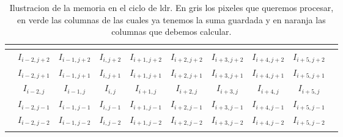 \begin{table}[h]
\centering
{}
\begin{tabular}{l|c|c|c|c|c|c|c|c|l}
 & \multicolumn{1}{l|}{}      & \multicolumn{1}{l|}{}       & \multicolumn{1}{l|}{}       & \multicolumn{1}{l|}{}
 & \multicolumn{1}{l|}{}      & \multicolumn{1}{l|}{}       & \multicolumn{1}{l|}{}       & \multicolumn{1}{l|}{}       &  \\ \hline

 & \cellcolor[HTML]{76E6A3}$I_{i-2,j+2}$ & \cellcolor[HTML]{98D0AE}$I_{i-1,j+2}$ & \cellcolor[HTML]{76E6A3}$I_{i  ,j+2}$ & \cellcolor[HTML]{98D0AE}$I_{i+1,j+2}$
 & \cellcolor[HTML]{FFBB78}$I_{i+2,j+2}$ & \cellcolor[HTML]{FF9D3E}$I_{i+3,j+2}$ & \cellcolor[HTML]{FFBB78}$I_{i+4,j+2}$ & \cellcolor[HTML]{FF9D3E}$I_{i+5,j+2}$ &  \\ \hline

 & \cellcolor[HTML]{76E6A3}$I_{i-2,j+1}$ & \cellcolor[HTML]{98D0AE}$I_{i-1,j+1}$ & \cellcolor[HTML]{76E6A3}$I_{i  ,j+1}$ & \cellcolor[HTML]{98D0AE}$I_{i+1,j+1}$
 & \cellcolor[HTML]{FFBB78}$I_{i+2,j+1}$ & \cellcolor[HTML]{FF9D3E}$I_{i+3,j+1}$ & \cellcolor[HTML]{FFBB78}$I_{i+4,j+1}$ & \cellcolor[HTML]{FF9D3E}$I_{i+5,j+1}$ &  \\ \hline

 & \cellcolor[HTML]{76E6A3}$I_{i-2,j  }$ & \cellcolor[HTML]{98D0AE}$I_{i-1,j  }$ & \cellcolor[HTML]{B1B1B1}$I_{i  ,j  }$ & \cellcolor[HTML]{B1B1B1}$I_{i+1,j  }$
 & \cellcolor[HTML]{B1B1B1}$I_{i+2,j  }$ & \cellcolor[HTML]{B1B1B1}$I_{i+3,j  }$ & \cellcolor[HTML]{FFBB78}$I_{i+4,j  }$ & \cellcolor[HTML]{FF9D3E}$I_{i+5,j  }$ &  \\ \hline

 & \cellcolor[HTML]{76E6A3}$I_{i-2,j-1}$ & \cellcolor[HTML]{98D0AE}$I_{i-1,j-1}$ & \cellcolor[HTML]{76E6A3}$I_{i  ,j-1}$ & \cellcolor[HTML]{98D0AE}$I_{i+1,j-1}$
 & \cellcolor[HTML]{FFBB78}$I_{i+2,j-1}$ & \cellcolor[HTML]{FF9D3E}$I_{i+3,j-1}$ & \cellcolor[HTML]{FFBB78}$I_{i+4,j-1}$ & \cellcolor[HTML]{FF9D3E}$I_{i+5,j-1}$ &  \\ \hline

 & \cellcolor[HTML]{76E6A3}$I_{i-2,j-2}$ & \cellcolor[HTML]{98D0AE}$I_{i-1,j-2}$ & \cellcolor[HTML]{76E6A3}$I_{i  ,j-2}$ & \cellcolor[HTML]{98D0AE}$I_{i+1,j-2}$
 & \cellcolor[HTML]{FFBB78}$I_{i+2,j-2}$ & \cellcolor[HTML]{FF9D3E}$I_{i+3,j-2}$ & \cellcolor[HTML]{FFBB78}$I_{i+4,j-2}$ & \cellcolor[HTML]{FF9D3E}$I_{i+5,j-2}$ &  \\ \hline

 & \multicolumn{1}{l|}{}      & \multicolumn{1}{l|}{}       & \multicolumn{1}{l|}{}       & \multicolumn{1}{l|}{}
 & \multicolumn{1}{l|}{}      & \multicolumn{1}{l|}{}       & \multicolumn{1}{l|}{}       & \multicolumn{1}{l|}{}       &
\end{tabular}
\caption{Ilustracion de la memoria en el ciclo de ldr. En gris los pixeles que queremos procesar, en verde las columnas de las cuales ya tenemos la suma guardada y en naranja las columnas que debemos calcular.}
\end{table}


